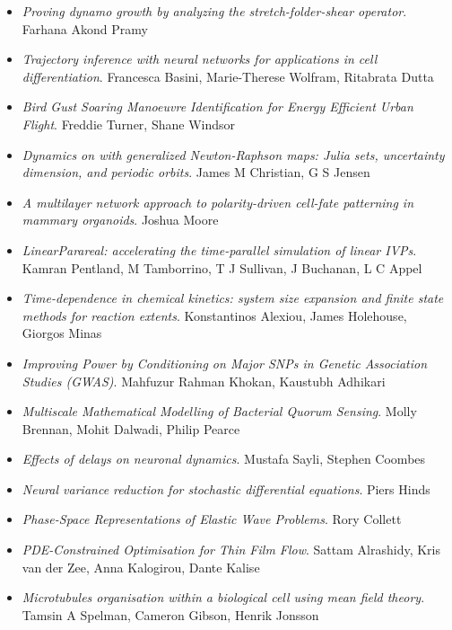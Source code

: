 \begin{itemize}
\item \textit{Proving dynamo growth by analyzing the stretch-folder-shear operator}.
Farhana Akond Pramy

\item \textit{Trajectory inference with neural networks for applications in cell differentiation}.
Francesca Basini, Marie-Therese Wolfram, Ritabrata Dutta

\item \textit{Bird Gust Soaring Manoeuvre Identification for Energy Efficient Urban Flight}.
Freddie Turner, Shane Windsor

\item \textit{Dynamics on \textcent{} with generalized Newton-Raphson maps: Julia sets, uncertainty dimension, and periodic orbits}.
James M Christian, G S Jensen

\item \textit{A multilayer network approach to polarity-driven cell-fate patterning in mammary organoids}.
Joshua Moore

\item \textit{LinearParareal: accelerating the time-parallel simulation of linear IVPs}.
Kamran Pentland, M Tamborrino, T J Sullivan, J Buchanan, L C Appel

\item \textit{Time-dependence in chemical kinetics: system size expansion and finite state methods for reaction extents}.
Konstantinos Alexiou, James Holehouse, Giorgos Minas

\item \textit{Improving Power by Conditioning on Major SNPs in Genetic Association Studies (GWAS)}.
Mahfuzur Rahman Khokan, Kaustubh Adhikari

\item \textit{Multiscale Mathematical Modelling of Bacterial Quorum Sensing}.
Molly Brennan, Mohit Dalwadi, Philip Pearce

\item \textit{Effects of delays on neuronal dynamics}.
Mustafa Sayli, Stephen Coombes

\item \textit{Neural variance reduction for stochastic differential equations}.
Piers Hinds

\item \textit{Phase-Space Representations of Elastic Wave Problems}.
Rory Collett

\item \textit{PDE-Constrained Optimisation for Thin Film Flow}.
Sattam Alrashidy, Kris van der Zee, Anna Kalogirou, Dante Kalise

\item \textit{Microtubules organisation within a biological cell using mean field theory}.
Tamsin A Spelman, Cameron Gibson, Henrik Jonsson

\end{itemize}

